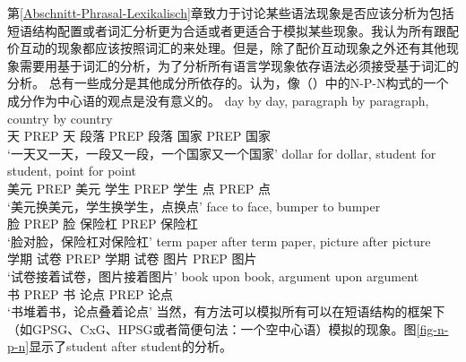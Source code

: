 %
第\ref{Abschnitt-Phrasal-Lexikalisch}章致力于讨论某些语法现象是否应该分析为包括短语结构配置或者词汇分析更为合适或者更适合于模拟某些现象。我认为所有跟配价互动的现象都应该按照词汇的来处理。但是，除了配价互动现象之外还有其他现象需要用基于词汇的分析，为了分析所有语言学现象依存语法必须接受基于词汇的分析。
总有一些成分是其他成分所依存的。\citet{Jackendoff2008a}认为，像（）中的N-P-N构式的一个成分作为中心语的观点是没有意义的。
\addlines
\eal
\ex 
\gll day by day, paragraph by paragraph, country by country\\
天 PREP 天 段落 PREP 段落 国家 PREP 国家\\
\glt `一天又一天，一段又一段，一个国家又一个国家'
\ex 
\gll dollar for dollar, student for student, point for point\\
美元 PREP 美元 学生 PREP 学生 点 PREP 点\\
\glt `美元换美元，学生换学生，点换点'
\ex 
\gll face to face, bumper to bumper\\
脸 PREP 脸 保险杠 PREP 保险杠\\
\glt `脸对脸，保险杠对保险杠'
\ex 
\gll term paper after term paper, picture after picture\\
学期 试卷 PREP 学期 试卷 图片 PREP 图片\\
\glt `试卷接着试卷，图片接着图片'
\ex 
\gll book upon book, argument upon argument\\
书 PREP 书 论点 PREP 论点\\
\glt `书堆着书，论点叠着论点'
\zl
当然，有方法可以模拟所有可以在短语结构的框架下（如GPSG、CxG、HPSG或者简便句法：一个空中心语）模拟的现象。图\vref{fig-n-p-n}显示了student after student的分析。
